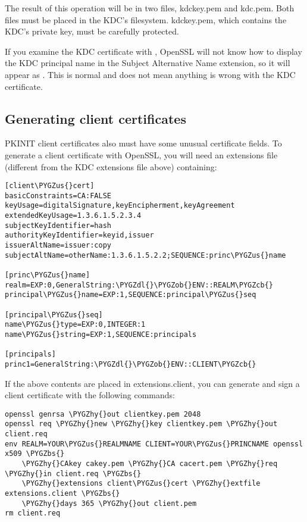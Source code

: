 \documentclass[letterpaper,10pt,english]{sphinxmanual}
\def\PYGZbs{\char`\\}
\def\PYGZus{\char`\_}
\def\PYGZob{\char`\{}
\def\PYGZcb{\char`\}}
\def\PYGZdl{\char`\$}
\def\PYGZhy{\char`\-}
\begin{document}
The result of this operation will be in two files, kdckey.pem and
kdc.pem.  Both files must be placed in the KDC's filesystem.
kdckey.pem, which contains the KDC's private key, must be carefully
protected.

If you examine the KDC certificate with , OpenSSL will not know how to display the KDC principal
name in the Subject Alternative Name extension, so it will appear as
.  This is normal and does not mean
anything is wrong with the KDC certificate.


\subsection{Generating client certificates}
\label{admin/pkinit:generating-client-certificates}
PKINIT client certificates also must have some unusual certificate
fields.  To generate a client certificate with OpenSSL, you will need
an extensions file (different from the KDC extensions file above)
containing:

\begin{Verbatim}[commandchars=\\\{\}]
[client\PYGZus{}cert]
basicConstraints=CA:FALSE
keyUsage=digitalSignature,keyEncipherment,keyAgreement
extendedKeyUsage=1.3.6.1.5.2.3.4
subjectKeyIdentifier=hash
authorityKeyIdentifier=keyid,issuer
issuerAltName=issuer:copy
subjectAltName=otherName:1.3.6.1.5.2.2;SEQUENCE:princ\PYGZus{}name

[princ\PYGZus{}name]
realm=EXP:0,GeneralString:\PYGZdl{}\PYGZob{}ENV::REALM\PYGZcb{}
principal\PYGZus{}name=EXP:1,SEQUENCE:principal\PYGZus{}seq

[principal\PYGZus{}seq]
name\PYGZus{}type=EXP:0,INTEGER:1
name\PYGZus{}string=EXP:1,SEQUENCE:principals

[principals]
princ1=GeneralString:\PYGZdl{}\PYGZob{}ENV::CLIENT\PYGZcb{}
\end{Verbatim}

If the above contents are placed in extensions.client, you can
generate and sign a client certificate with the following commands:

\begin{Verbatim}[commandchars=\\\{\}]
openssl genrsa \PYGZhy{}out clientkey.pem 2048
openssl req \PYGZhy{}new \PYGZhy{}key clientkey.pem \PYGZhy{}out client.req
env REALM=YOUR\PYGZus{}REALMNAME CLIENT=YOUR\PYGZus{}PRINCNAME openssl x509 \PYGZbs{}
    \PYGZhy{}CAkey cakey.pem \PYGZhy{}CA cacert.pem \PYGZhy{}req \PYGZhy{}in client.req \PYGZbs{}
    \PYGZhy{}extensions client\PYGZus{}cert \PYGZhy{}extfile extensions.client \PYGZbs{}
    \PYGZhy{}days 365 \PYGZhy{}out client.pem
rm client.req
\end{Verbatim}
\end{document}
